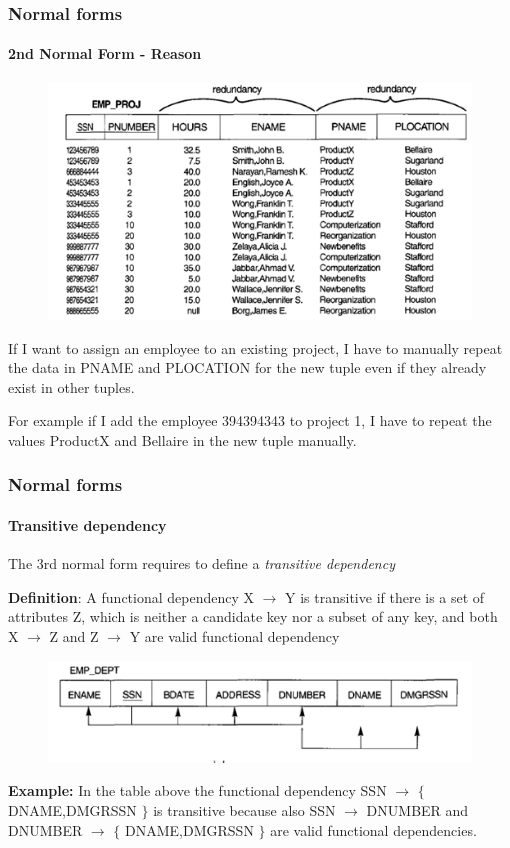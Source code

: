 \documentclass{beamer}
\newcommand{\valseq}[1]{$\lbrace$ #1 $\rbrace$}
\newcommand{\fdep}[2]{#1 $\rightarrow$ #2}
\begin{document}
\begin{frame}
	\frametitle{Normal forms}
	\framesubtitle{2nd Normal Form - Reason}
	
	\begin{figure}
		\includegraphics[scale=0.4]{img/normalization/norm10}
	\end{figure}
	
	If I want to assign an employee to an existing project, I have to manually repeat the data in PNAME and PLOCATION for the new tuple even if they already exist in other tuples.
	
	
	For example if I add the employee 394394343 to project 1, I have to repeat the values ProductX and Bellaire in the new tuple manually.
\end{frame}

\begin{frame}
	\frametitle{Normal forms}
	\framesubtitle{Transitive dependency}
	
	The 3rd normal form requires to define a \textit{transitive dependency}
	
	\textbf{Definition}:
	A functional dependency \fdep{X}{Y} is transitive if there is a set of attributes Z, which is neither a candidate key nor a subset of any key, and both \fdep{X}{Z} and \fdep{Z}{Y} are valid functional dependency
	
	\begin{figure}
		\includegraphics[scale=0.4]{img/normalization/norm9}
	\end{figure}
	
	\textbf{Example:}
	In the table above the functional dependency \fdep{SSN}{\valseq{DNAME,DMGRSSN}} is transitive because also \fdep{SSN}{DNUMBER} and \fdep{DNUMBER}{\valseq{DNAME,DMGRSSN}} are valid functional dependencies.	
\end{frame}
\end{document}
